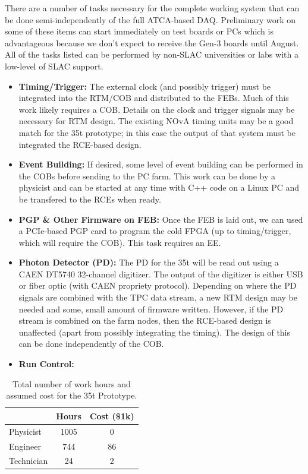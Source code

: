 There are a number of tasks necessary for the complete working system that can be done semi-independently of the full ATCA-based DAQ.  Preliminary work on some of these items can start immediately on test boards or PCs which is advantageous because we don't expect to receive the Gen-3 boards until August.  All of the tasks listed can be performed by non-SLAC universities or labs with a low-level of SLAC support.  
\begin{itemize}
\item \textbf{Timing/Trigger:  }The external clock (and possibly trigger) must be integrated into the RTM/COB and distributed to the FEBs.  Much of this work likely requires a COB.  Details on the clock and trigger signals may be necessary for RTM design.   The existing NOvA timing units may be a good match for the 35t prototype; in this case the output of that system must be integrated the RCE-based design.  
\item \textbf{Event Building:  }If desired, some level of event building can be performed in the COBs before sending to the PC farm.  This work can be done by a physicist and can be started at any time with C++ code on a Linux PC and be transfered to the RCEs when ready.   
\item \textbf{PGP \& Other Firmware on FEB:   } Once the FEB is laid out,  we can used a PCIe-based PGP card to program  the cold FPGA (up to timing/trigger, which will require the COB).  This task requires an EE.    
\item \textbf{Photon Detector (PD):  }The PD for the 35t will be read out using a CAEN DT5740 32-channel digitizer.  The output of the digitizer is either USB or fiber optic (with CAEN propriety protocol).   Depending on where the PD signals are combined with the TPC data stream, a new RTM design may be needed and some, small amount of firmware written.  However, if the PD stream is combined on the farm nodes, then the RCE-based design is unaffected (apart from possibly integrating the timing).  The design of this can be done independently of the COB.  
\item \textbf{Run Control:  }
\end{itemize}


\begin{table}[tbh]
\begin{center}
\begin{tabular}{|l|c|c|}   
\hline \hline 
    & Hours  & Cost (\$1k) \\      
\hline
   Physicist           & 1005 &0 \\ 
   Engineer           & 744&86 \\ 
   Technician        & 24&2\\ 
\hline \hline
\end{tabular}
\caption[]{Total number of work hours and assumed cost for the 35t Prototype.}
\label{tab:labor} 
\end{center}
\end{table}





